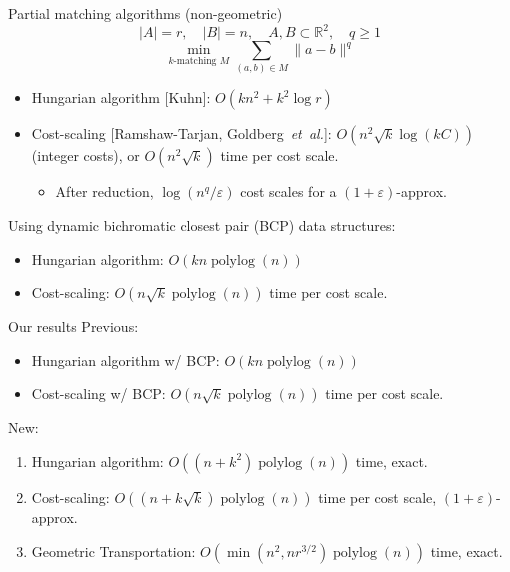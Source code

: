 \documentclass[xcolor={dvipsnames,usenames}]{beamer}
\newcommand{\etal}{\textit{et~al.}}
\newcommand{\reals}{\mathbb{R}}
\newcommand{\eps}{\varepsilon}
\DeclareMathOperator{\polylog}{polylog}
\begin{document}
\begin{frame}{Partial matching algorithms (non-geometric)}
\begin{equation*}
|A| = r, \quad |B| = n, \quad A, B \subset \reals^2, \quad q \geq 1 
\end{equation*}
\begin{equation*}
\min_{k \text{-matching } M}\sum_{(a, b) \in M} \|a - b\|^q
\end{equation*}
\begin{itemize}
\item Hungarian algorithm [Kuhn]: $O(kn^2 + k^2\log r)$
\item Cost-scaling [Ramshaw-Tarjan, Goldberg~\etal]: $O(n^2\sqrt{k}\log(kC))$ (integer costs),
	or $O(n^2\sqrt{k})$ time per cost scale. \pause
	\begin{itemize}
	\item After reduction, $\log(n^q/\eps)$ cost scales for a $(1+\eps)$-approx. \pause
	\end{itemize}
\end{itemize}
\vspace{10pt}
Using dynamic bichromatic closest pair (BCP) data structures:
\begin{itemize}
\item Hungarian algorithm: $O(kn\polylog(n))$
\item Cost-scaling: $O(n\sqrt{k}\polylog(n))$ time per cost scale.
\end{itemize}
\end{frame}

\begin{frame}{Our results}
Previous:
\begin{itemize}
\item Hungarian algorithm w/ BCP: $O(kn\polylog(n))$
\item Cost-scaling w/ BCP: $O(n\sqrt{k}\polylog(n))$ time per cost scale.
\end{itemize}
\pause
\vspace{10pt}

New:
\begin{enumerate}
\item Hungarian algorithm: $O((n+k^2)\polylog(n))$ time, exact.
\item Cost-scaling: $O((n+k\sqrt{k})\polylog(n))$ time per cost scale, $(1+\eps)$-approx.
\pause
\vspace{10pt}
\item Geometric Transportation: $O(\min(n^2, nr^{3/2})\polylog(n))$ time, exact.
\end{enumerate}
\end{frame}
\end{document}
